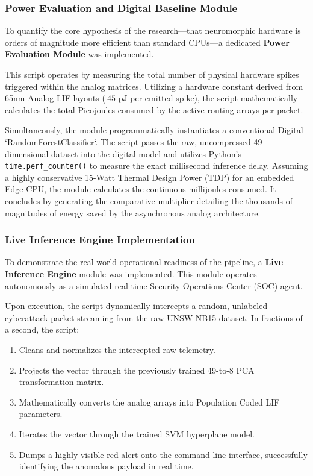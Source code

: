 \documentclass{ieeeaccess}
\begin{document}
\subsubsection{Power Evaluation and Digital Baseline Module}

To quantify the core hypothesis of the research—that neuromorphic hardware is orders of magnitude more efficient than standard CPUs—a dedicated \textbf{Power Evaluation Module} was implemented.

This script operates by measuring the total number of physical hardware spikes triggered within the analog matrices. Utilizing a hardware constant derived from 65nm Analog LIF layouts ($~45\text{ pJ}$ per emitted spike), the script mathematically calculates the total Picojoules consumed by the active routing arrays per packet.

Simultaneously, the module programmatically instantiates a conventional Digital `RandomForestClassifier`. The script passes the raw, uncompressed 49-dimensional dataset into the digital model and utilizes Python's \texttt{time.perf\_counter()} to measure the exact millisecond inference delay. Assuming a highly conservative 15-Watt Thermal Design Power (TDP) for an embedded Edge CPU, the module calculates the continuous millijoules consumed. It concludes by generating the comparative multiplier detailing the thousands of magnitudes of energy saved by the asynchronous analog architecture.

\subsubsection{Live Inference Engine Implementation}

To demonstrate the real-world operational readiness of the pipeline, a \textbf{Live Inference Engine} module was implemented. This module operates autonomously as a simulated real-time Security Operations Center (SOC) agent. 

Upon execution, the script dynamically intercepts a random, unlabeled cyberattack packet streaming from the raw UNSW-NB15 dataset. In fractions of a second, the script:
\begin{enumerate}
\item Cleans and normalizes the intercepted raw telemetry.
\item Projects the vector through the previously trained 49-to-8 PCA transformation matrix.
\item Mathematically converts the analog arrays into Population Coded LIF parameters.
\item Iterates the vector through the trained SVM hyperplane model.
\item Dumps a highly visible red alert onto the command-line interface, successfully identifying the anomalous payload in real time.
\end{enumerate}
\end{document}

